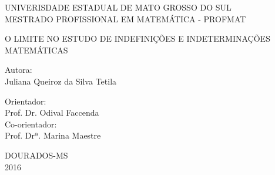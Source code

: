 \thispagestyle{empty}
\begin{center}


\normalsize{UNIVERISDADE ESTADUAL DE MATO GROSSO DO SUL\\ MESTRADO PROFISSIONAL EM MATEMÁTICA - PROFMAT}


\vspace*{3cm}

\Large{O LIMITE NO ESTUDO DE INDEFINIÇÕES E INDETERMINAÇÕES MATEMÁTICAS}


\vspace*{3cm}
\normalsize{Autora:}\\
\normalsize{Juliana Queiroz da Silva Tetila}

\vspace*{2cm}
\normalsize{Orientador:}\\
\normalsize{Prof. Dr. Odival Faccenda}\\
\normalsize{Co-orientador:}\\
\normalsize{Prof. Drª. Marina Maestre}
\vspace*{6cm}


\large{DOURADOS-MS \\ 2016}
\end{center}